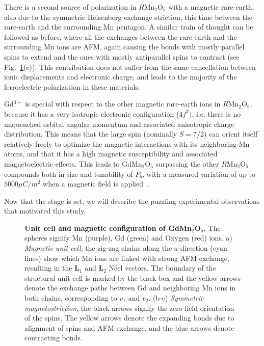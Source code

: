 There is a second source of polarization in $R$Mn$_2$O$_5$ with a magnetic rare-earth, also due to the symmetric Heisenberg exchange striction, this time between the rare-earth and the surrounding Mn pentagon.
A similar train of thought can be followed as before, where all the exchanges between the rare earth and the surrounding Mn ions are AFM, again causing the bonds with mostly parallel spins to extend and the ones with mostly antiparallel spins to contract (see Fig.~\ref{fig:GdMn2O5_unit_cell}(c)).
This contribution does not suffer from the same cancellation between ionic displacements and electronic charge, and leads to the majority of the ferroelectric polarization in these materials.

Gd$^{3+}$ is special with respect to the other magnetic rare-earth ions in $R$Mn$_2$O$_5$, because it has a very isotropic electronic configuration (4$f^7$), i.e. there is no unquenched orbital angular momentum and associated anisotropic charge distribution. This means that the large spin (nominally $S=7/2$) can orient itself relatively freely to optimize the magnetic interactions with its neighboring Mn atoms, and that it has a high magnetic susceptibility and associated magnetoelectric effects.
This leads to GdMn$_2$O$_5$ surpassing the other $R$Mn$_2$O$_5$ compounds both in size and tunability of $P_b$, with a measured variation of up to $5000 \mu C/m^2$ when a magnetic field is applied~\cite{Lee13}. 

Now that the stage is set, we will describe the puzzling experimental observations that motivated this study.

\begin{figure}
	\caption{\label{fig:GdMn2O5_unit_cell}{\bf Unit cell and magnetic configuration of GdMn$_2$O$_5$.} The spheres signify Mn (purple), Gd (green) and Oxygen (red) ions. a) {\it Magnetic unit cell}, the zig-zag chains along the $a$-direction (cyan lines) show which Mn ions are linked with strong AFM exchange, resulting in the $\mathbf{L}_1$ and $\mathbf{L}_2$ N\'eel vectors. The boundary of the structural unit cell is marked by the black box and the yellow arrows denote the exchange paths between Gd and neighboring Mn ions in both chains, corresponding to $v_1$ and $v_2$. (b-c) {\it Symmetric magnetostriction}, the black arrows signify the zero field orientation of the spins. The yellow arrows denote the expanding bonds due to alignment of spins and AFM exchange, and the blue arrows denote contracting bonds.}
\end{figure}
